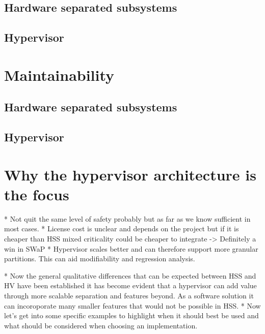\subsection{Hardware separated subsystems}
\subsection{Hypervisor}


\section{Maintainability}
\subsection{Hardware separated subsystems}
\subsection{Hypervisor}


\section{Why the hypervisor architecture is the focus}

* Not quit the same level of safety probably but as far as we know sufficient in most cases. 
* License cost is unclear and depends on the project but if it is cheaper than HSS mixed criticality could be cheaper to integrate
-> Definitely a win in SWaP
* Hypervisor scales better and can therefore support more granular partitions. This can aid modifiability and regression analysis.

* Now the general qualitative differences that can be expected between HSS and HV have been established it has become evident that a hypervisor can add value through more scalable separation and features beyond. As a software solution it can incoroporate many smaller features that would not be possible in HSS.
* Now let's get into some specific examples to highlight when it should best be used and what should be considered when choosing an implementation.
